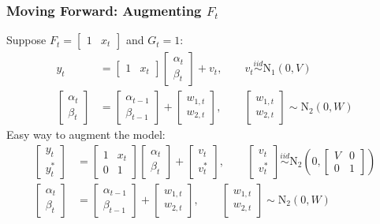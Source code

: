\documentclass[xcolor=dvipsnames]{beamer}
\newcommand\N{\mathrm{N}}
\begin{document}
\begin{frame}
\frametitle{Moving Forward: Augmenting $F_t$}
Suppose $F_t=\begin{bmatrix}1 & x_t\end{bmatrix}$ and $G_t=1$:
\begin{align*}
y_t &= \begin{bmatrix}1 & x_t\end{bmatrix}\begin{bmatrix}\alpha_t \\ \beta_t\end{bmatrix} + v_t, \qquad v_t\stackrel{iid}{\sim}\N_1(0,V)\\
\begin{bmatrix}\alpha_t \\ \beta_t\end{bmatrix} &= \begin{bmatrix}\alpha_{t-1} \\ \beta_{t-1}\end{bmatrix} + \begin{bmatrix}w_{1,t} \\ w_{2,t}\end{bmatrix}, \qquad \begin{bmatrix}w_{1,t} \\ w_{2,t}\end{bmatrix}\sim\N_2(0,W)
\end{align*}
Easy way to augment the model:
\begin{align*}
\begin{bmatrix}y_t \\ y_t^*\end{bmatrix} &= \begin{bmatrix}1 & x_t\\ 0 & 1\end{bmatrix}\begin{bmatrix}\alpha_t \\ \beta_t\end{bmatrix} + \begin{bmatrix}v_t \\ v_t^* \end{bmatrix}, \qquad \begin{bmatrix} v_t\\ v_t^* \end{bmatrix}\stackrel{iid}{\sim}\N_2\left(0,\begin{bmatrix}V & 0 \\ 0 & 1\end{bmatrix}\right)\\
\begin{bmatrix}\alpha_t \\ \beta_t\end{bmatrix} &= \begin{bmatrix}\alpha_{t-1} \\ \beta_{t-1}\end{bmatrix} + \begin{bmatrix}w_{1,t} \\ w_{2,t}\end{bmatrix}, \qquad \begin{bmatrix}w_{1,t} \\ w_{2,t}\end{bmatrix}\sim\N_2(0,W)

\end{align*}
\end{frame}
\end{document}
